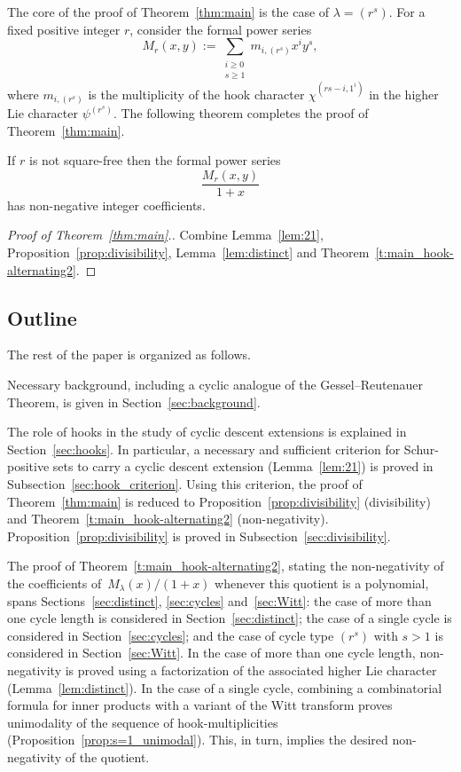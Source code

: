 The core of the proof of Theorem~\ref{thm:main} is 
the case of $\lambda = (r^s)$.
For a fixed positive integer $r$, consider the formal power series
\[
    M_r(x,y) := \sum_{\substack{i \ge 0 \\ s \ge 1}} m_{i,(r^s)} x^i y^s,
\]
where $m_{i,(r^s)}$ is the multiplicity of the hook character $\chi^{(rs-i,1^i)}$ in the higher Lie character $\psi^{(r^s)}$. 
The following theorem completes the proof of Theorem~\ref{thm:main}.
 
\begin{theorem}\label{t:main_hook-alternating2}
    If $r$ is not square-free then the formal power series 
    \[
        \frac{M_r(x,y)}{1+x}
    \] 
	has non-negative integer coefficients.
\end{theorem}

\begin{proof}[Proof of Theorem~\ref{thm:main}.]
    Combine Lemma~\ref{lem:21}, Proposition~\ref{prop:divisibility}, Lemma~\ref{lem:distinct} and Theorem~\ref{t:main_hook-alternating2}. 
\end{proof}
    

\subsection{Outline}

The rest of the paper is organized as follows. 

Necessary background, including a cyclic analogue of the Gessel--Reutenauer Theorem, is given in Section~\ref{sec:background}.

The role of hooks in the study of cyclic descent extensions is explained in Section~\ref{sec:hooks}.
In particular, a necessary and sufficient criterion
for Schur-positive sets to carry a cyclic descent extension (Lemma~\ref{lem:21}) is proved in Subsection~\ref{sec:hook_criterion}.
Using this criterion, the proof of Theorem~\ref{thm:main} is reduced
to Proposition~\ref{prop:divisibility} (divisibility) and  Theorem~\ref{t:main_hook-alternating2} (non-negativity).
Proposition~\ref{prop:divisibility} is proved in Subsection~\ref{sec:divisibility}.  

The proof of Theorem~\ref{t:main_hook-alternating2}, stating the non-negativity of the coefficients of~$M_\lambda(x)/(1+x)$ whenever this quotient is a polynomial, spans 
Sections~\ref{sec:distinct}, \ref{sec:cycles} and~\ref{sec:Witt}:
the case of more than one cycle length is considered in Section~\ref{sec:distinct};
the case of a single cycle 
is considered in Section~\ref{sec:cycles};
and the case of cycle type $(r^s)$ with $s>1$ is considered in Section~\ref{sec:Witt}.
In the case of more than one cycle length, 
non-negativity is proved using a factorization of the associated higher Lie character (Lemma~\ref{lem:distinct}).  
In the case of a single cycle,  
combining a combinatorial formula for inner products with a variant of the Witt transform 
proves unimodality of the sequence of hook-multiplicities (Proposition~\ref{prop:s=1_unimodal}). This, in turn, implies the desired non-negativity of the quotient.  

